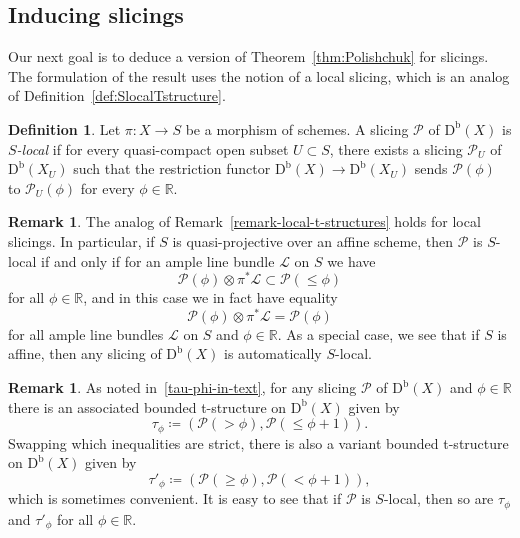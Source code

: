 \documentclass[11pt, reqno]{amsart}
\numberwithin{equation}{section}
\theoremstyle{plain}
\theoremstyle{remark}
\theoremstyle{definition}
\newtheorem{definition}[theorem]{Definition}
\newtheorem{remark}[theorem]{Remark}
\theoremstyle{italicsname}
\newcommand{\Db}{\mathrm{D^b}}
\newcommand{\cL}{\mathcal{L}}
\newcommand{\cP}{\mathscr{P}}
\def\RR{\ensuremath{\mathbb{R}}}
\begin{document}
\subsection{Inducing slicings} 
Our next goal is to deduce a version of Theorem~\ref{thm:Polishchuk} for slicings. 
The formulation of the result uses the notion of a local slicing, which is an analog of Definition~\ref{def:SlocalTstructure}. 

\begin{definition}\label{def:SlocalSlicing}
Let $\pi \colon X\to S$ be a morphism of schemes.   
A slicing $\cP$ of $\Db(X)$ is \emph{$S$-local} if for every quasi-compact open subset $U\subset S$, there exists a slicing $\cP_U$ of $\Db(X_U)$ such that the restriction functor $\Db(X) \to \Db(X_U)$ sends $\cP(\phi)$ to $\cP_U(\phi)$ for every $\phi\in \mathbb{R}$.
\end{definition}

\begin{remark}
The analog of Remark~\ref{remark-local-t-structures} holds for local slicings. 
In particular, if $S$ is quasi-projective over an affine scheme, then 
$\cP$ is $S$-local if and only if for an ample line bundle $\cL$ on $S$ we have 
\begin{equation*}
\cP(\phi)\otimes \pi^*\cL\subset\cP(\leq\phi)
\end{equation*}
for all $\phi\in\RR$, and in this case we in fact have equality 
\begin{equation*}
    \cP(\phi)\otimes \pi^*\cL=\cP(\phi)
\end{equation*}
for all ample line bundles $\cL$ on $S$ and $\phi \in \RR$. 
As a special case, we see that if $S$ is affine, then any slicing of $\Db(X)$ is automatically $S$-local.
\end{remark}

\begin{remark}
As noted in~\eqref{tau-phi-in-text}, for any slicing $\cP$ of $\Db(X)$ and $\phi \in \RR$ there is an associated bounded t-structure on $\Db(X)$ given by 
\begin{equation*}
\tau_{\phi} \coloneqq  (\cP(>\phi),\cP(\leq \phi+1)). 
\end{equation*}
Swapping which inequalities are strict, there is also a variant bounded t-structure on $\Db(X)$ given by  
\begin{equation}\label{tau-prime}
\tau'_{\phi}\coloneqq\left(\cP(\geq\phi),\cP(<\phi+1)\right),
\end{equation}
which is sometimes convenient. 
It is easy to see that if $\cP$ is $S$-local, then so are $\tau_{\phi}$ and $\tau'_{\phi}$ for all $\phi \in \RR$. 
\end{remark}
\end{document}
